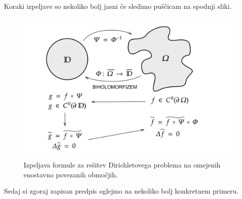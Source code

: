 \documentclass[mat1, tisk]{fmfdelo}
\begin{document}
    Koraki izpeljave so nekoliko bolj jasni če sledimo puščicam na spodnji sliki. 
    \begin{figure}[H]
        \begin{center}
            \includegraphics[width = \textwidth]{dirichlet_splosno.png}
            \caption{Izpeljava formule za rešitev Dirichletovega problema na omejenih enostavno povezanih območjih.}
        \end{center}    
    \end{figure}
    Sedaj si zgoraj zapisan predpis oglejmo na nekoliko bolj konkretnem primeru. 
    
\end{document}
